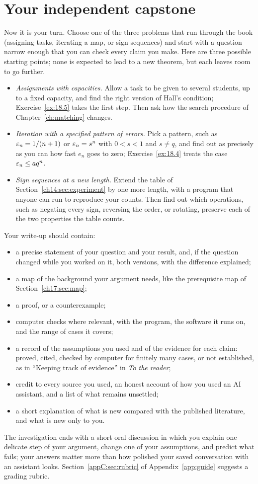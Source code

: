 \section{Your independent capstone}\label{ch18:sec:independent}
Now it is your turn. Choose one of the three problems that run through the book (assigning tasks, iterating a map, or sign sequences) and start with a question narrow enough that you can check every claim you make. Here are three possible starting points; none is expected to lead to a new theorem, but each leaves room to go further.
\begin{itemize}
\item \emph{Assignments with capacities.} Allow a task to be given to several students, up to a fixed capacity, and find the right version of Hall's condition; Exercise~\ref{ex:18.5} takes the first step. Then ask how the search procedure of Chapter~\ref{ch:matching} changes.
\item \emph{Iteration with a specified pattern of errors.} Pick a pattern, such as $\varepsilon_n=1/(n+1)$ or $\varepsilon_n=s^n$ with $0<s<1$ and $s\ne q$, and find out as precisely as you can how fast $e_n$ goes to zero; Exercise~\ref{ex:18.4} treats the case $\varepsilon_n\le aq^n$.
\item \emph{Sign sequences at a new length.} Extend the table of Section~\ref{ch14:sec:experiment} by one more length, with a program that anyone can run to reproduce your counts. Then find out which operations, such as negating every sign, reversing the order, or rotating, preserve each of the two properties the table counts.
\end{itemize}
Your write-up should contain:
\begin{itemize}
\item a precise statement of your question and your result, and, if the question changed while you worked on it, both versions, with the difference explained;
\item a map of the background your argument needs, like the prerequisite map of Section~\ref{ch17:sec:map};
\item a proof, or a counterexample;
\item computer checks where relevant, with the program, the software it runs on, and the range of cases it covers;
\item a record of the assumptions you used and of the evidence for each claim: proved, cited, checked by computer for finitely many cases, or not established, as in ``Keeping track of evidence'' in \emph{To the reader};
\item credit to every source you used, an honest account of how you used an AI assistant, and a list of what remains unsettled;
\item a short explanation of what is new compared with the published literature, and what is new only to you.
\end{itemize}
The investigation ends with a short oral discussion in which you explain one delicate step of your argument, change one of your assumptions, and predict what fails; your answers matter more than how polished your saved conversation with an assistant looks. Section~\ref{appC:sec:rubric} of Appendix~\ref{app:guide} suggests a grading rubric.

